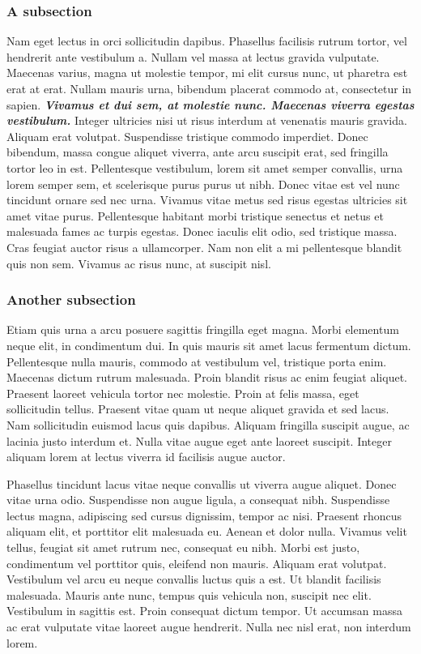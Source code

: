 \documentclass[12pt, a4paper]{article}
\begin{document}
\subsubsection{A subsection}
\label{subsubsec:intro:1}

Nam eget lectus in orci sollicitudin dapibus. Phasellus facilisis rutrum tortor, vel hendrerit ante vestibulum a. Nullam vel massa at lectus gravida vulputate. Maecenas varius, magna ut molestie tempor, mi elit cursus nunc, ut pharetra est erat at erat. Nullam mauris urna, bibendum placerat commodo at, consectetur in sapien. \textbf{\textit{Vivamus et dui sem, at molestie nunc. Maecenas viverra egestas vestibulum.}} Integer ultricies nisi ut risus interdum at venenatis mauris gravida. Aliquam erat volutpat. Suspendisse tristique commodo imperdiet. Donec bibendum, massa congue aliquet viverra, ante arcu suscipit erat, sed fringilla tortor leo in est. Pellentesque vestibulum, lorem sit amet semper convallis, urna lorem semper sem, et scelerisque purus purus ut nibh. Donec vitae est vel nunc tincidunt ornare sed nec urna. Vivamus vitae metus sed risus egestas ultricies sit amet vitae purus. Pellentesque habitant morbi tristique senectus et netus et malesuada fames ac turpis egestas. Donec iaculis elit odio, sed tristique massa. Cras feugiat auctor risus a ullamcorper. Nam non elit a mi pellentesque blandit quis non sem. Vivamus ac risus nunc, at suscipit nisl.

\subsubsection{Another subsection}
\label{subsubsec:intro:2}

Etiam quis urna a arcu posuere sagittis fringilla eget magna. Morbi elementum neque elit, in condimentum dui. In quis mauris sit amet lacus fermentum dictum. Pellentesque nulla mauris, commodo at vestibulum vel, tristique porta enim. Maecenas dictum rutrum malesuada. Proin blandit risus ac enim feugiat aliquet. Praesent laoreet vehicula tortor nec molestie. Proin at felis massa, eget sollicitudin tellus. Praesent vitae quam ut neque aliquet gravida et sed lacus. Nam sollicitudin euismod lacus quis dapibus. Aliquam fringilla suscipit augue, ac lacinia justo interdum et. Nulla vitae augue eget ante laoreet suscipit. Integer aliquam lorem at lectus viverra id facilisis augue auctor.

Phasellus tincidunt lacus vitae neque convallis ut viverra augue aliquet. Donec vitae urna odio. Suspendisse non augue ligula, a consequat nibh. Suspendisse lectus magna, adipiscing sed cursus dignissim, tempor ac nisi. Praesent rhoncus aliquam elit, et porttitor elit malesuada eu. Aenean et dolor nulla. Vivamus velit tellus, feugiat sit amet rutrum nec, consequat eu nibh. Morbi est justo, condimentum vel porttitor quis, eleifend non mauris. Aliquam erat volutpat. Vestibulum vel arcu eu neque convallis luctus quis a est. Ut blandit facilisis malesuada. Mauris ante nunc, tempus quis vehicula non, suscipit nec elit. Vestibulum in sagittis est. Proin consequat dictum tempor. Ut accumsan massa ac erat vulputate vitae laoreet augue hendrerit. Nulla nec nisl erat, non interdum lorem.
\end{document}
